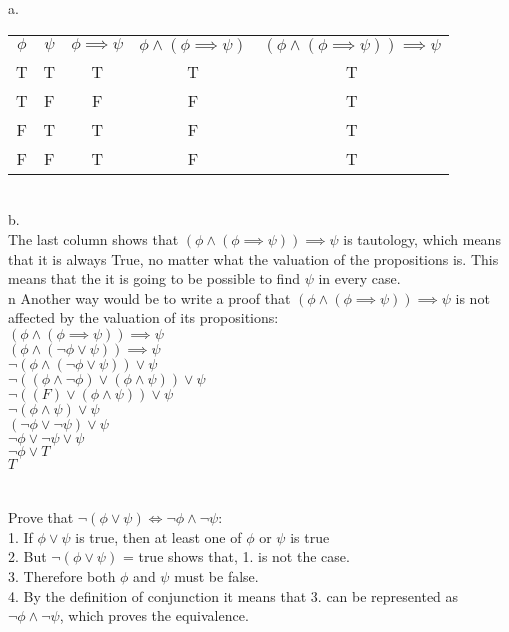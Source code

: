 \documentclass{article}
\begin{document}
\section{}
a. \\
\begin{tabular}{ c c c c c }
  $\phi$ & $\psi$ & $\phi \implies \psi$ & $\phi \wedge (\phi \implies \psi)$ & $(\phi \wedge (\phi \implies \psi)) \implies \psi$ \\
  T      & T      & T                    & T                    & T                                                  \\
  T      & F      & F                    & F                    & T                                                 \\
  F      & T      & T                    & F                    & T                                                 \\
  F      & F      & T                    & F                    & T                                                  \\
\end{tabular}
\\
b. \\
The last column shows that $(\phi \wedge (\phi \implies \psi)) \implies \psi$ is tautology, which means that it is always True, no matter what the valuation of the propositions is. This means that the it is going to be possible to find $\psi$ in every case. \\n
Another way would be to write a proof that  $(\phi \wedge (\phi \implies \psi)) \implies \psi$ is not affected by the valuation of its propositions:\\
$(\phi \wedge (\phi \implies \psi)) \implies \psi$ \\
$(\phi \wedge (\neg\phi \vee \psi)) \implies \psi$ \\
$\neg(\phi \wedge (\neg\phi \vee \psi)) \vee \psi$ \\
$\neg((\phi \wedge \neg\phi) \vee (\phi \wedge \psi)) \vee \psi$ \\
$\neg((F) \vee (\phi \wedge \psi)) \vee \psi$ \\
$\neg(\phi \wedge \psi) \vee \psi$ \\
$(\neg\phi \vee \neg\psi) \vee \psi$ \\
$\neg\phi \vee \neg\psi \vee \psi$ \\
$\neg\phi \vee T$   \\
$T$

\section{}
Prove that $\neg (\phi \vee \psi) \Leftrightarrow \neg\phi \wedge \neg\psi$: \\
1. If $\phi \vee \psi$ is true, then at least one of $\phi$ or $\psi$ is true \\
2. But $\neg(\phi \vee \psi)$ = true shows that, 1. is not the case. \\
3. Therefore both $\phi$ and $\psi$ must be false. \\
4. By the definition of conjunction it means that 3. can be represented as $\neg\phi \wedge \neg\psi$, which proves the equivalence. \\
\end{document}
